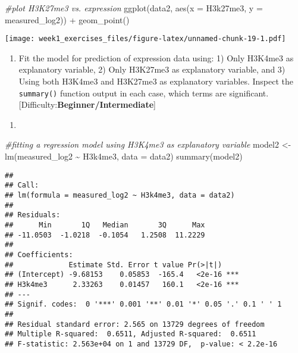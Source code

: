 \documentclass[
]{article}
\newenvironment{Shaded}{\begin{snugshade}}{\end{snugshade}}
\newcommand{\AttributeTok}[1]{\textcolor[rgb]{0.77,0.63,0.00}{#1}}
\newcommand{\CommentTok}[1]{\textcolor[rgb]{0.56,0.35,0.01}{\textit{#1}}}
\newcommand{\FunctionTok}[1]{\textcolor[rgb]{0.00,0.00,0.00}{#1}}
\newcommand{\NormalTok}[1]{#1}
\newcommand{\OtherTok}[1]{\textcolor[rgb]{0.56,0.35,0.01}{#1}}
\newcommand{\SpecialCharTok}[1]{\textcolor[rgb]{0.00,0.00,0.00}{#1}}
\providecommand{\tightlist}{%
  \setlength{\itemsep}{0pt}\setlength{\parskip}{0pt}}
\begin{document}
\begin{Shaded}
\begin{Highlighting}[]
\CommentTok{\#plot H3K27me3 vs. expression}
\FunctionTok{ggplot}\NormalTok{(data2, }\FunctionTok{aes}\NormalTok{(}\AttributeTok{x =}\NormalTok{ H3k27me3, }\AttributeTok{y =}\NormalTok{ measured\_log2)) }\SpecialCharTok{+} 
  \FunctionTok{geom\_point}\NormalTok{()}
\end{Highlighting}
\end{Shaded}

\texttt{[image: week1\_exercises\_files/figure-latex/unnamed-chunk-19-1.pdf]}

\begin{enumerate}
\def\labelenumi{\arabic{enumi}.}
\setcounter{enumi}{7}
\tightlist
\item
  Fit the model for prediction of expression data using: 1) Only H3K4me3
  as explanatory variable, 2) Only H3K27me3 as explanatory variable, and
  3) Using both H3K4me3 and H3K27me3 as explanatory variables. Inspect
  the \texttt{summary()} function output in each case, which terms are
  significant. {[}Difficulty:\textbf{Beginner/Intermediate}{]}
\end{enumerate}

\begin{enumerate}
\def\labelenumi{\arabic{enumi})}
\tightlist
\item
\end{enumerate}

\begin{Shaded}
\begin{Highlighting}[]
\CommentTok{\#fitting a regression model using H3K4me3 as explanatory variable}
\NormalTok{model2 }\OtherTok{\textless{}{-}} \FunctionTok{lm}\NormalTok{(measured\_log2 }\SpecialCharTok{\textasciitilde{}}\NormalTok{ H3k4me3, }\AttributeTok{data =}\NormalTok{ data2)}
\FunctionTok{summary}\NormalTok{(model2)}
\end{Highlighting}
\end{Shaded}

\begin{verbatim}
## 
## Call:
## lm(formula = measured_log2 ~ H3k4me3, data = data2)
## 
## Residuals:
##      Min       1Q   Median       3Q      Max 
## -11.0503  -1.0218  -0.1054   1.2508  11.2229 
## 
## Coefficients:
##             Estimate Std. Error t value Pr(>|t|)    
## (Intercept) -9.68153    0.05853  -165.4   <2e-16 ***
## H3k4me3      2.33263    0.01457   160.1   <2e-16 ***
## ---
## Signif. codes:  0 '***' 0.001 '**' 0.01 '*' 0.05 '.' 0.1 ' ' 1
## 
## Residual standard error: 2.565 on 13729 degrees of freedom
## Multiple R-squared:  0.6511, Adjusted R-squared:  0.6511 
## F-statistic: 2.563e+04 on 1 and 13729 DF,  p-value: < 2.2e-16
\end{verbatim}
\end{document}
